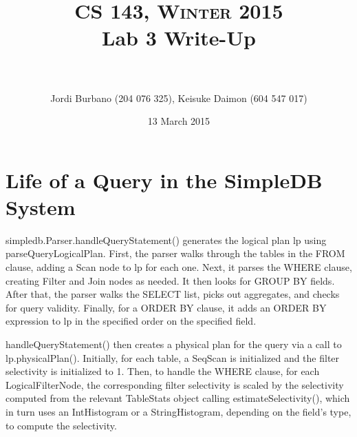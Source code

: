 \documentclass[paper=a4, fontsize=11pt]{scrartcl} %
\title{	
\normalfont \normalsize \textsc{CS 143, Winter 2015}
\horrule{0.5pt} \\[0.4cm] %
\huge Lab 3 Write-Up \\ %
\horrule{2pt} \\[0.5cm] %
}
\author{Jordi Burbano (204 076 325), Keisuke Daimon (604 547 017)} %
\date{\normalsize 13 March 2015} %
\numberwithin{equation}{section} %
\numberwithin{figure}{section} %
\numberwithin{table}{section} %
\begin{document}
\maketitle %

\section{Life of a Query in the SimpleDB System}


simpledb.Parser.handleQueryStatement() generates the logical plan lp using parseQueryLogicalPlan. First, the parser walks through the tables in the FROM clause, adding a Scan node to lp for each one. Next, it parses the WHERE clause, creating Filter and Join nodes as needed. It then looks for GROUP BY fields. After that, the parser walks the SELECT list, picks out aggregates, and checks for query validity. Finally, for a ORDER BY clause, it adds an ORDER BY expression to lp in the specified order on the specified field.

handleQueryStatement() then creates a physical plan for the query via a call to lp.physicalPlan().%
 Initially, for each table, a SeqScan is initialized and the filter selectivity is initialized to 1. Then, to handle the WHERE clause, for each LogicalFilterNode, the corresponding filter selectivity is scaled by the selectivity computed from the relevant TableStats object calling estimateSelectivity(), which in turn uses an IntHistogram or a StringHistogram, depending on the field's type, to compute the selectivity.


\end{document}
